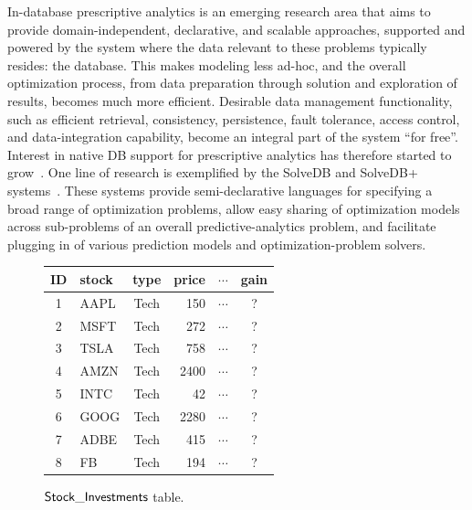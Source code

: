 \documentclass[11pt]{article}
\newcommand{\attr}[1]{{\sf #1}}
\newcommand{\ssf}[1]{{${\sf #1}$}}
\begin{document}
In-database prescriptive analytics is an emerging research area that aims to
provide domain-independent, declarative, and scalable approaches, supported and
powered by the system where the data relevant to these problems typically
resides: the database. This makes modeling less ad-hoc, and the overall
optimization process, from data preparation through solution and exploration of
results, becomes much more efficient. Desirable data management functionality,
such as efficient retrieval, consistency, persistence, fault tolerance, access
control, and data-integration capability, become an integral part of the system
``for free''. Interest in native DB support for prescriptive analytics has
therefore started to grow~\cite{FrazzettoDPS19}. One line of research is
exemplified by the SolveDB and SolveDB+ systems~\cite{SiksnysP16,SiksnysPNF21}.
These systems provide semi-declarative languages for specifying a broad range
of optimization problems, allow easy sharing of optimization models across
sub-problems of an overall predictive-analytics problem, and facilitate
plugging in of various prediction models and optimization-problem solvers.
\begin{figure}
\centering
{\small
\begin{tabular}{clcrcc}
\attr{ID} & \attr{stock} & \attr{type} & \attr{price} & $\cdots$ & \attr{gain}\\
\hline
1  & AAPL  &Tech & 150 & $\cdots$ & ? \\
2  & MSFT  &Tech & 272 & $\cdots$ & ? \\
3  & TSLA  &Tech & 758 & $\cdots$ & ? \\
4  & AMZN  &Tech & 2400 & $\cdots$ & ? \\
5  & INTC  &Tech & 42 & $\cdots$ & ? \\
6  & GOOG  &Tech & 2280 & $\cdots$ & ? \\
7  & ADBE  &Tech & 415 & $\cdots$ & ? \\
8  & FB    &Tech & 194 & $\cdots$ & ? \\
\hline
\end{tabular}}
\vspace{-4mm}
\caption{\ssf{Stock\_Investments} table.}\label{fig:stock_investments}
\end{figure}
\end{document}

